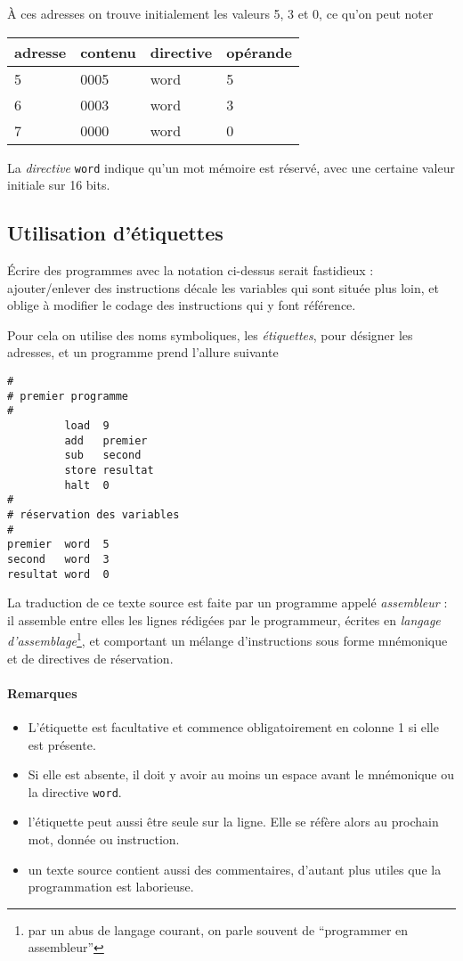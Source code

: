 \documentclass[10pt]{article}
\begin{document}
À ces adresses on trouve initialement les valeurs 5, 3 et 0, ce qu'on peut noter
\begin{center}
\begin{tabular}{ll|ll}
adresse & contenu & directive & opérande \\ \hline 5 & 0005 & word & 5
\\ 6 & 0003 & word & 3 \\ 7 & 0000 & word & 0
\end{tabular}
\end{center}
 
La \emph{directive} \texttt{word} indique qu'un mot mémoire est réservé,
avec une certaine valeur initiale sur 16 bits.

\subsection{Utilisation d'étiquettes}

Écrire des programmes avec la notation ci-dessus serait fastidieux :
ajouter/enlever des instructions décale les variables qui sont située
plus loin, et oblige à modifier le codage des instructions qui y font 
référence.

Pour cela on utilise des noms symboliques, les \emph{étiquettes}, pour
désigner les adresses, et un programme prend l'allure suivante
\begin{lstlisting}[frame=single]
#
# premier programme
#
         load  9
         add   premier
         sub   second
         store resultat
         halt  0
#
# réservation des variables
#
premier  word  5
second   word  3
resultat word  0
\end{lstlisting}

La traduction de ce texte source est faite par un programme appelé
\emph{assembleur} : il assemble entre elles les lignes rédigées par
le programmeur, écrites en \emph{langage d'assemblage}\footnote{par un
  abus de langage courant, on parle souvent de ``programmer en
  assembleur''}, et comportant un mélange d'instructions sous forme
mnémonique et de directives de réservation.



\paragraph{Remarques}
\begin{itemize}
\item 
L'étiquette est facultative et commence obligatoirement en colonne 1
si elle est présente. 
\item
Si elle est absente, il doit y avoir au moins
un espace avant le mnémonique ou la directive \texttt{word}.
\item l'étiquette peut aussi être seule sur la ligne. Elle se réfère alors
au prochain mot, donnée ou instruction. 
\item un texte source contient aussi des commentaires, d'autant plus
utiles que la programmation est laborieuse.
\end{itemize}
 
\end{document}
